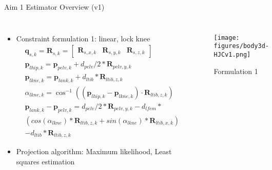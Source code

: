 \documentclass[aspectratio=169]{beamer}
\newcommand{\mat}[1]{\mathbf{#1}}
\renewcommand{\vec}{\mathbf}
\begin{document}
        \begin{frame}{Aim 1 Estimator Overview (v1)}
            \begin{columns}
                \begin{itemize}
                    \item Constraint formulation 1: linear, lock knee
                        { \tiny \begin{align*}
                            & \vec{q}_{s, k} = \mat{R}_{s, k} = 
                                \begin{bmatrix}
                                    \vec{R}_{s, x, k} & \vec{R}_{s, y, k} & \vec{R}_{s, z, k}
                                \end{bmatrix} \\
    	                    & \vec{p}_{lhip, k} = \vec{p}_{pelv, k} + d_{pelv}/2*\vec{R}_{pelv, y, k} \\
                            & \vec{p}_{lkne, k} = \vec{p}_{lank, k} + d_{ltib}*\vec{R}_{ltib, z, k} \\
                            & \alpha_{lkne, k} = \cos^{-1} \left( (\vec{p}_{lhip, k} - \vec{p}_{lkne, k} ) \cdot \vec{R}_{ltib, z, k} \right)\\
                            & \vec{p}_{lank, k} - \vec{p}_{pelv, k} = d_{pelv}/2*\vec{R}_{pelv, y, k} - d_{lfem}* \\
                            & \left(  cos(\alpha_{lkne})*\vec{R}_{ltib, z, k} + sin(\alpha_{lkne})*\vec{R}_{ltib, x, k} \right) \\
                            & - d_{ltib}*\vec{R}_{ltib, z, k}
                        \end{align*}  }%
                    \item Projection algorithm: Maximum likelihood, Least squares estimation
                \end{itemize}
                
                \begin{figure}
                    \centering
                    \texttt{[image: figures/body3d-HJCv1.png]}
                    \caption*{Formulation 1}
                \end{figure}
            \end{columns}
        \end{frame}
        
\end{document}
